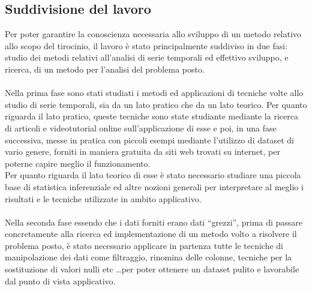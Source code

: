 \subsection{Suddivisione del lavoro}
Per poter garantire la conoscienza necessaria allo sviluppo di un metodo relativo allo scopo
del tirocinio, il lavoro è stato principalmente suddiviso in due fasi: studio dei metodi
relativi all'analisi di serie temporali ed effettivo sviluppo, e ricerca, di un metodo per l'analisi
del problema posto.\\
\\
Nella prima fase sono stati studiati i metodi ed applicazioni di tecniche volte allo studio
di serie temporali, sia da un lato pratico che da un lato teorico. Per quanto riguarda il lato 
pratico, queste tecniche sono state studiante mediante la ricerca di articoli e videotutorial online
sull'applicazione di esse e poi, in una fase successiva, messe in pratica con piccoli esempi 
mediante l'utilizzo di dataset di vario genere, forniti in maniera gratuita da siti web trovati 
su internet, per poterne capire meglio il funzionamento.\\
Per quanto riguarda il lato teorico di esse è stato necessario studiare una piccola base di statistica
inferenziale ed altre nozioni generali per interpretare al meglio i risultati e le tecniche utilizzate in 
ambito applicativo.\\
\\
Nella seconda fase essendo che i dati forniti erano dati ``grezzi'', prima di passare concretamente 
alla ricerca ed implementazione di un metodo volto a risolvere il problema posto, è stato 
necessario applicare in partenza tutte le tecniche di manipolazione dei dati come filtraggio, 
rinomina delle colonne, tecniche per la sostituzione di valori nulli etc \dots per poter 
ottenere un dataset pulito e lavorabile dal punto di vista applicativo. 